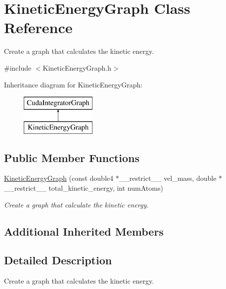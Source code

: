 \hypertarget{classKineticEnergyGraph}{}\section{Kinetic\+Energy\+Graph Class Reference}
\label{classKineticEnergyGraph}


Create a graph that calculates the kinetic energy.  




{\ttfamily \#include $<$Kinetic\+Energy\+Graph.\+h$>$}

Inheritance diagram for Kinetic\+Energy\+Graph\+:\begin{figure}[H]
\begin{center}
\leavevmode
\includegraphics[height=2.000000cm]{classKineticEnergyGraph}
\end{center}
\end{figure}
\subsection*{Public Member Functions}
\begin{DoxyCompactItemize}
\item 
\hyperlink{classKineticEnergyGraph_a5dea5ca46df5e90b2b9ceb5624876113}{Kinetic\+Energy\+Graph} (const double4 $\ast$\+\_\+\+\_\+restrict\+\_\+\+\_\+ vel\+\_\+mass, double $\ast$\+\_\+\+\_\+restrict\+\_\+\+\_\+ total\+\_\+kinetic\+\_\+energy, int num\+Atoms)
\begin{DoxyCompactList}\small\item\em Create a graph that calculate the kinetic energy. \end{DoxyCompactList}\end{DoxyCompactItemize}
\subsection*{Additional Inherited Members}


\subsection{Detailed Description}
Create a graph that calculates the kinetic energy. 



